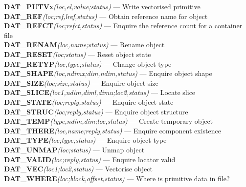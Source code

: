 {\bf DAT\_PUTVx}{\em (loc,el,value;status)} --- Write vectorised primitive\\
{\bf DAT\_REF}{\em (loc;ref,lref,status)} --- Obtain reference name for object \\
{\bf DAT\_REFCT}{\em (loc;refct,status)} --- Enquire the reference count for
a container file \\
{\bf DAT\_RENAM}{\em (loc,name;status)} --- Rename object \\
{\bf DAT\_RESET}{\em (loc;status)} --- Reset object state \\
{\bf DAT\_RETYP}{\em (loc,type;status)} --- Change object type \\
{\bf DAT\_SHAPE}{\em (loc,ndimx;dim,ndim,status)} --- Enquire object shape \\
{\bf DAT\_SIZE}{\em (loc;size,status)} --- Enquire object size \\
{\bf DAT\_SLICE}{\em (loc1,ndim,diml,dimu;loc2,status)} --- Locate slice \\
{\bf DAT\_STATE}{\em (loc;reply,status)} --- Enquire object state \\
{\bf DAT\_STRUC}{\em (loc;reply,status)} --- Enquire object structure \\
{\bf DAT\_TEMP}{\em (type,ndim,dim;loc,status)} --- Create temporary object \\
{\bf DAT\_THERE}{\em (loc,name;reply,status)} --- Enquire component existence \\
{\bf DAT\_TYPE}{\em (loc;type,status)} --- Enquire object type \\
{\bf DAT\_UNMAP}{\em (loc;status)} --- Unmap object \\
{\bf DAT\_VALID}{\em (loc;reply,status)} --- Enquire locator valid \\
{\bf DAT\_VEC}{\em (loc1;loc2,status)} --- Vectorise object \\
{\bf DAT\_WHERE}{\em (loc;block,offset,status)} --- Where is primitive data in file? \\

